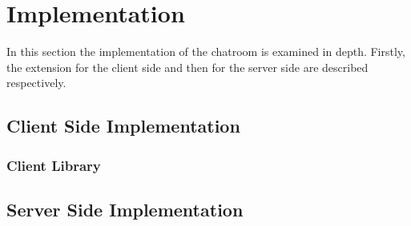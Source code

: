 \section{Implementation}
\label{sec:implementation}

In this section the implementation of the chatroom is examined in depth. Firstly, the extension for the client side and then for the server side are described respectively. 

\subsection{Client Side Implementation}
\label{sec:Implementation_clintside}


\subsubsection{Client Library}
\label{sec:implementation_clientside_clientlib}


 
 
\subsection{Server Side Implementation}
\label{sec:implementation_serverside}